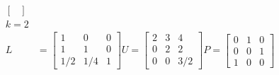 \documentclass[11pt]{article}
\begin{document}
\begin{enumerate}
\begin{enumerate}
\begin{align*}
\begin{bmatrix}
                    \end{bmatrix} \\
                    k = 2 \\
                    L &=
                    \begin{bmatrix}
                        1 & 0 & 0 \\
                        1 & 1 & 0 \\
                        1/2 & 1/4 & 1
                    \end{bmatrix}
                    U =
                    \begin{bmatrix}
                        2 & 3 & 4 \\
                        0 & 2 & 2 \\
                        0 & 0 & 3/2
                    \end{bmatrix}
                    P =
                    \begin{bmatrix}
                        0 & 1 & 0 \\
                        0 & 0 & 1 \\
                        1 & 0 & 0
                    \end{bmatrix} \\
                \end{align*}


\end{enumerate}
\end{enumerate}
\end{document}
